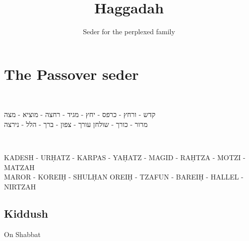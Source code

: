 \documentclass[a4paper,12pt,openany]{memoir}
\title{Haggadah}
\author{Seder for the perplexed family}
\newenvironment{HgHebrew}{\begin{hebrew}\strut\\\noindent\Large}{\end{hebrew}}
\newenvironment{HgTranslit}{\strut\\\noindent\begin{itshape}}{\end{itshape}\vspace{1em}}
\begin{document}
\maketitle

\chapter*{The Passover seder}

\vfill

\vspace{-2em}
\begin{HgHebrew}
  \begin{center}
  קדש 
  -
  ורחץ
  -
  כרפס 
  -
  יחץ 
  -
  מגיד 
  -
  רחצה 
  -
  מוציא
  -
  מצה 
  \\
  מרור 
  -
  כורך 
  -
  שולחן עורך 
  -
  צפון
  -
  ברך 
  -
  הלל 
  -
  נירצה 
  \end{center}
\end{HgHebrew}
\vspace{-3em}
\begin{HgTranslit}
  \begin{center}
  {\small 
    KADESH - UR\d{H}ATZ - KARPAS - YA\d{H}ATZ - %
    MAGID - RA\d{H}TZA - MOTZI - MATZAH \\ 
    MAROR - KOREI\d{H} - SHUL\d{H}AN OREI\d{H} - %
    TZAFUN - BAREI\d{H} - HALLEL - NIRTZAH}
  \end{center}
\end{HgTranslit}


\newpage

\section*{Kiddush}

\noindent
On Shabbat
\end{document}
